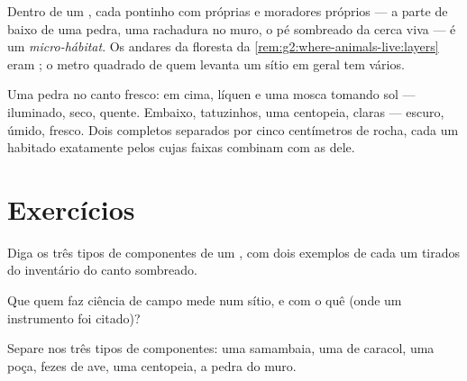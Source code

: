 \begin{definition}\label{def:g6:exploring-our-environment:microhabitat}
Dentro de um , cada pontinho com  próprias e
moradores próprios --- a parte de baixo de uma pedra, uma rachadura
no muro, o pé sombreado da cerca viva --- é um
\emph{micro-hábitat}. Os andares da floresta da
\cref{rem:g2:where-animals-live:layers} eram ; o metro
quadrado de quem levanta um sítio em geral tem vários.
\end{definition}

\begin{example}\label{ex:g6:exploring-our-environment:stone}
Uma pedra no canto fresco: em cima, líquen e uma mosca tomando sol
--- iluminado, seco, quente. Embaixo, tatuzinhos, uma centopeia,
 claras --- escuro, úmido, fresco. Dois 
completos separados por cinco centímetros de rocha, cada um habitado
exatamente pelos  cujas faixas combinam com as 
dele.
\end{example}

\section{Exercícios}

\begin{exercise}[$\star$]\label{exo:g6:exploring-our-environment:1}
Diga os três tipos de componentes de um , com dois exemplos
de cada um tirados do inventário do canto sombreado.
\end{exercise}

\begin{exercise}[$\star$]\label{exo:g6:exploring-our-environment:2}
Que  quem faz ciência de campo mede num sítio, e com o quê
(onde um instrumento foi citado)?
\end{exercise}

\begin{exercise}[$\star$]\label{exo:g6:exploring-our-environment:3}
Separe nos três tipos de componentes: uma samambaia, uma  de
caracol, uma poça, fezes de ave, uma centopeia, a pedra do muro.
\end{exercise}

